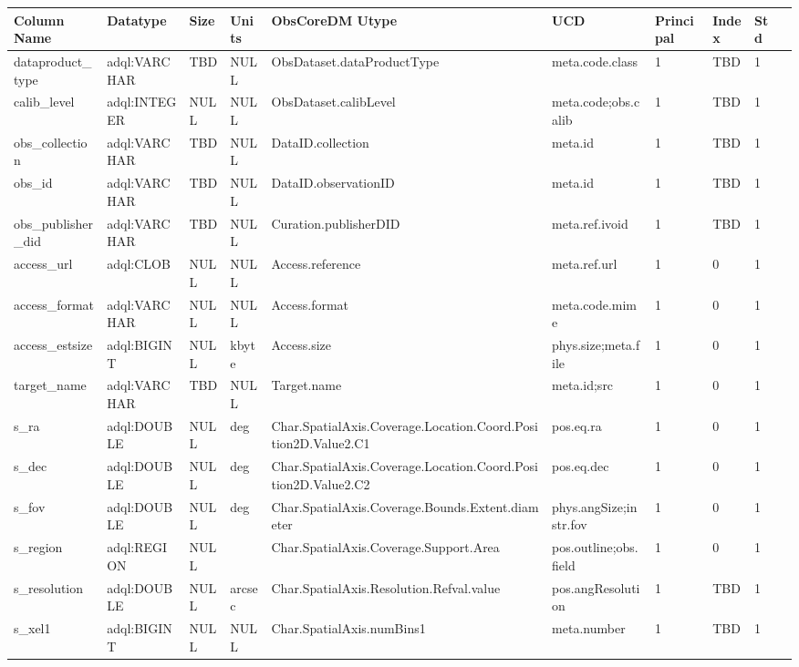 \documentclass[11pt,a4paper]{ivoa}
\begin{document}
\begin{tabular}{|l|p{}|p{}|p{}|p{}|
  p{}|p{}|p{}|p{}|p{}|}
\hline
Column Name & Datatype & Size & Units & ObsCoreDM Utype & UCD & Principal & Index & Std\\\hline
dataproduct\_type &
adql:VARCHAR &
TBD &
NULL &
ObsDataset.dataProductType &
meta.code.class &
1 &
TBD &
1\\\hline
calib\_level &
adql:INTEGER &
NULL &
NULL &
ObsDataset.calibLevel &
meta.code;obs.calib &
1 &
TBD &
1\\\hline
obs\_collection &
adql:VARCHAR &
TBD &
NULL &
DataID.collection &
meta.id &
1 &
TBD &
1\\\hline
obs\_id &
adql:VARCHAR &
TBD &
NULL &
DataID.observationID &
meta.id &
1 &
TBD &
1\\\hline
obs\_publisher\_did &
adql:VARCHAR &
TBD &
NULL &
Curation.publisherDID &
meta.ref.ivoid &
1 &
TBD &
1\\\hline
access\_url &
adql:CLOB &
NULL &
NULL &
Access.reference &
meta.ref.url &
1 &
0 &
1\\\hline
access\_format &
adql:VARCHAR &
NULL &
NULL &
Access.format &
meta.code.mime &
1 &
0 &
1\\\hline
access\_estsize &
adql:BIGINT &
NULL &
kbyte &
Access.size &
phys.size;meta.file &
1 &
0 &
1\\\hline
target\_name &
adql:VARCHAR &
TBD &
NULL &
Target.name &
meta.id;src &
1 &
0 &
1\\\hline
s\_ra &
adql:DOUBLE &
NULL &
deg &
Char.SpatialAxis.Coverage.Location.Coord.Position2D.Value2.C1 &
pos.eq.ra &
1 &
0 &
1\\\hline
s\_dec &
adql:DOUBLE &
NULL &
deg &
Char.SpatialAxis.Coverage.Location.Coord.Position2D.Value2.C2 &
pos.eq.dec &
1 &
0 &
1\\\hline
s\_fov &
adql:DOUBLE &
NULL &
deg &
Char.SpatialAxis.Coverage.Bounds.Extent.diameter &
phys.angSize;instr.fov &
1 &
0 &
1\\\hline
s\_region &
adql:REGION &
NULL &
 &
Char.SpatialAxis.Coverage.Support.Area &
pos.outline;obs.field &
1 &
0 &
1\\\hline
s\_resolution &
adql:DOUBLE &
NULL &
arcsec &
Char.SpatialAxis.Resolution.Refval.value &
pos.angResolution &
1 &
TBD &
1\\\hline
s\_xel1 &
adql:BIGINT &
NULL &
NULL &
Char.SpatialAxis.numBins1 &
meta.number &
1 &
TBD &
1\\\hline

\end{tabular}
\end{document}
